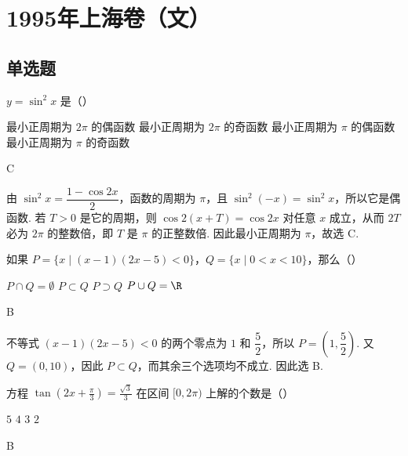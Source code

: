 \chapter{1995年上海卷（文）}
\section{单选题}

\begin{problem}
\(y=\sin^2 x\) 是（\quad）

\choices
    {最小正周期为 \(2\pi \) 的偶函数}
    {最小正周期为 \(2 \pi\) 的奇函数}
    {最小正周期为 \(\pi \) 的偶函数}
    {最小正周期为 \(\pi\) 的奇函数}
\end{problem}

\begin{answer}
C
\end{answer}

\begin{solution}
由 \(\sin^2x=\dfrac{1-\cos2x}{2}\)，函数的周期为 \(\pi\)，且 \(\sin^2(-x)=\sin^2x\)，所以它是偶函数. 若 \(T>0\) 是它的周期，则 \(\cos2(x+T)=\cos2x\) 对任意 \(x\) 成立，从而 \(2T\) 必为 \(2\pi\) 的整数倍，即 \(T\) 是 \(\pi\) 的正整数倍. 因此最小正周期为 \(\pi\)，故选 C.
\end{solution}

\begin{problem}
如果 \(P = \{x \mid (x - 1)(2x - 5) < 0\}\)，\(Q = \{x \mid 0 < x < 10\}\)，那么（\quad）

\choices
    {\(P\cap Q=\emptyset\)}
    {\(P \subset Q\)}
    {\(P\supset Q\)}
    {\(P\cup Q=\R\)}
\end{problem}

\begin{answer}
B
\end{answer}

\begin{solution}
不等式 \((x-1)(2x-5)<0\) 的两个零点为 \(1\) 和 \(\dfrac{5}{2}\)，所以 \(P=\left(1,\dfrac{5}{2}\right)\). 又 \(Q=(0,10)\)，因此 \(P\subset Q\)，而其余三个选项均不成立. 因此选 B.
\end{solution}

\begin{problem}
方程 \(\tan\left(2x+\frac{\pi}{3}\right)=\frac{\sqrt{3}}{3}\) 在区间 \([0,2\pi)\) 上解的个数是（\quad）

\choices
    {\(5\)}
    {\(4\)}
    {\(3\)}
    {\(2\)}
\end{problem}

\begin{answer}
B
\end{answer}

